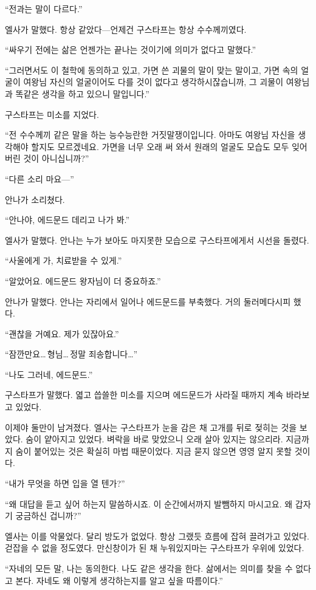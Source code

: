 ``전과는 말이 다르다.''

엘사가 말했다. 항상 같았다—언제건 구스타프는 항상 수수께끼였다.

``싸우기 전에는 삶은 언젠가는 끝나는 것이기에 의미가 없다고 말했다.''

``그러면서도 이 철학에 동의하고 있고, 가면 쓴 괴물의 말이 맞는 말이고, 가면 속의 얼굴이 여왕님 자신의 얼굴이어도 다를 것이 없다고 생각하시잖습니까, 그 괴물이 여왕님과 똑같은 생각을 하고 있으니 말입니다.''

구스타프는 미소를 지었다.

``전 수수께끼 같은 말을 하는 능수능란한 거짓말쟁이입니다. 아마도 여왕님 자신을 생각해야 할지도 모르겠네요. 가면을 너무 오래 써 와서 원래의 얼굴도 모습도 모두 잊어버린 것이 아니십니까?''

``다른 소리 마요—''

안나가 소리쳤다.

``안나야, 에드문드 데리고 나가 봐.''

엘사가 말했다. 안나는 누가 보아도 마지못한 모습으로 구스타프에게서 시선을 돌렸다.

``사울에게 가, 치료받을 수 있게.''

``알았어요. 에드문드 왕자님이 더 중요하죠.''

안나가 말했다. 안나는 자리에서 일어나 에드문드를 부축했다. 거의 둘러메다시피 했다.

``괜찮을 거예요. 제가 있잖아요.''

``잠깐만요\ldots\,형님\ldots\,정말 죄송합니다\ldots''

``나도 그러네, 에드문드.''

구스타프가 말했다. 엷고 씁쓸한 미소를 지으며 에드문드가 사라질 때까지 계속 바라보고 있었다.

이제야 둘만이 남겨졌다. 엘사는 구스타프가 눈을 감은 채 고개를 뒤로 젖히는 것을 보았다. 숨이 얕아지고 있었다. 벼락을 바로 맞았으니 오래 살아 있지는 않으리라. 지금까지 숨이 붙어있는 것은 확실히 마법 때문이었다. 지금 묻지 않으면 영영 알지 못할 것이다.

``내가 무엇을 하면 입을 열 텐가?''

``왜 대답을 듣고 싶어 하는지 말씀하시죠. 이 순간에서까지 발뺌하지 마시고요. 왜 갑자기 궁금하신 겁니까?''

엘사는 이를 악물었다. 달리 방도가 없었다. 항상 그랬듯 흐름에 잡혀 끌려가고 있었다. 걷잡을 수 없을 정도였다. 만신창이가 된 채 누워있지마는 구스타프가 우위에 있었다.

``자네의 모든 말, 나는 동의한다. 나도 같은 생각을 한다. 삶에서는 의미를 찾을 수 없다고 본다. 자네도 왜 이렇게 생각하는지를 알고 싶을 따름이다.''

